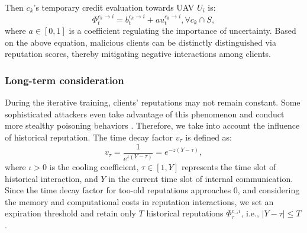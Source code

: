 \documentclass[lettersize,journal]{IEEEtran}
\begin{document}
Then $c_k$'s temporary credit evaluation towards UAV $U_i$ is:
\begin{equation}
\Phi^{c_k \rightarrow i}_{t}=b^{c_k \rightarrow i}_{t} + a u^{c_k \rightarrow i}_{t}, \forall c_k \cap S,
\end{equation}
where $a\in[0,1]$ is a coefficient regulating the importance of uncertainty. 
Based on the above equation, malicious clients can be distinctly distinguished via reputation scores, thereby mitigating negative interactions among clients. 

\subsubsection{Long-term consideration}
During the iterative training, clients' reputations may not remain constant. Some sophisticated attackers even take advantage of this phenomenon and conduct more stealthy poisoning behaviors \cite{credit1-kang2019IOT}. Therefore, we take into account the influence of historical reputation. The time decay factor $v_{\tau}$ is defined as:
\begin{equation}
v_{\tau}=\frac{1}{e^{\iota(Y-\tau)}}=e^{-z(Y-\tau)},
\end{equation}
where $\iota>0$ is the cooling coefficient, $\tau \in [1,Y]$ represents the time slot of historical interaction, and $Y$ in the current time slot of internal communication. Since the time decay factor for too-old reputations approaches 0, and considering the memory and computational costs in reputation interactions, we set an expiration threshold and retain only $T$ historical reputations $\Phi^{c_ \rightarrow i}_{\tau}$, i.e., $\vert Y-\tau \vert \leq T$. %
\end{document}
